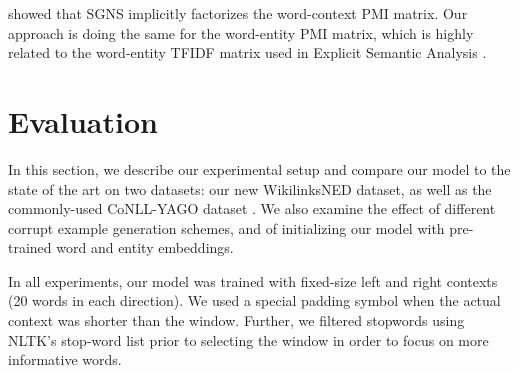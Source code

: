 \documentclass[11pt]{article}
\begin{document}
 showed that SGNS implicitly factorizes the word-context PMI matrix. Our approach is doing the same for the word-entity PMI matrix, which is highly related to the word-entity TFIDF matrix used in Explicit Semantic Analysis \cite{gabrilovich2007computing}.

\section{Evaluation}
\label{experiments}

In this section, we describe our experimental setup and compare our model to the state of the art on two datasets: our new WikilinksNED dataset, as well as the commonly-used CoNLL-YAGO dataset \cite{hoffart2011robust}. We also examine the effect of different corrupt example generation schemes, and of initializing our model with pre-trained word and entity embeddings.

In all experiments, our model was trained with fixed-size left and right contexts (20 words in each direction). We used a special padding symbol when the actual context was shorter than the window. Further, we filtered stopwords using NLTK's stop-word list prior to selecting the window in order to focus on more informative words.

\end{document}
